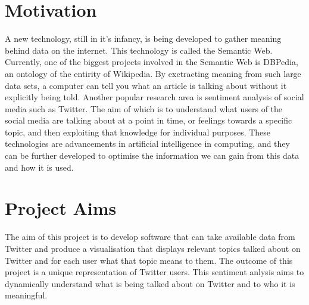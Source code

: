 \section{Motivation}
A new technology, still in it's infancy, is being developed to gather meaning behind data on the internet. This technology is called the Semantic Web. Currently, one of the biggest projects involved in the Semantic Web is DBPedia, an ontology of the entirity of Wikipedia. By exctracting meaning from such large data sets, a computer can tell you what an article is talking about without it explicitly being told. 
Another popular research area is sentiment analysis of social media such as Twitter. The aim of which is to understand what users of the social media are talking about at a point in time, or feelings towards a specific topic, and then exploiting that knowledge for individual purposes.
These technologies are advancements in artificial intelligence in computing, and they can be further developed to optimise the information we can gain from this data and how it is used. 

\section{Project Aims}
The aim of this project is to develop software that can take available data from Twitter and produce a visualisation that displays relevant topics talked about on Twitter and for each user what that topic means to them. The outcome of this project is a unique representation of Twitter users.
This sentiment anlysis aims to dynamically understand what is being talked about on Twitter and to who it is meaningful.

